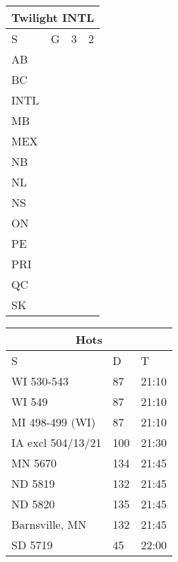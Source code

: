 \documentclass{article}
\begin{document}
\begin{tabular}[t]{@{}ll|l|l@{}}
\multicolumn{4}{c}{\textbf{Twilight INTL}}                               \\ 
\toprule
S    & G                  & 3                & 2                \\ \midrule
AB   & \cellcolor{blue}   & \cellcolor{blue} & \cellcolor{blue} \\
BC   & \cellcolor{yellow} &                  & \cellcolor{blue} \\
INTL & \cellcolor{blue}   & \cellcolor{blue} & \cellcolor{blue} \\
MB   & \cellcolor{blue}   & \cellcolor{blue} & \cellcolor{blue} \\
MEX  & \cellcolor{blue}   & \cellcolor{blue} & \cellcolor{blue} \\
NB   & \cellcolor{red}    &                  & \cellcolor{blue} \\
NL   & \cellcolor{red}    &                  & \cellcolor{blue} \\
NS   & \cellcolor{red}    &                  & \cellcolor{blue} \\
ON   & \cellcolor{purple} &                  & \cellcolor{blue} \\
PE   & \cellcolor{red}    &                  & \cellcolor{blue} \\
PRI  & \cellcolor{orange} & \cellcolor{blue} & \cellcolor{blue} \\
QC   & \cellcolor{red}    &                  & \cellcolor{blue} \\
SK   & \cellcolor{blue}   & \cellcolor{blue} & \cellcolor{blue} \\ \bottomrule
\end{tabular}
\hspace{1em}
\Large
\begin{tabular}[t]{@{}lll@{}}
\multicolumn{3}{c}{\textbf{Hots}}                                          \\ 
\toprule
S                 & D   & T     \\ \midrule
WI 530-543        & 87  & 21:10 \\
WI 549            & 87  & 21:10 \\
MI 498-499 (WI)   & 87  & 21:10 \\
IA excl 504/13/21 & 100 & 21:30 \\
MN 5670           & 134 & 21:45 \\
ND 5819           & 132 & 21:45 \\
ND 5820           & 135 & 21:45 \\
Barnsville, MN    & 132 & 21:45 \\
SD 5719           & 45  & 22:00 \\ \bottomrule
\end{tabular}
\vspace{10ex}
\end{document}
